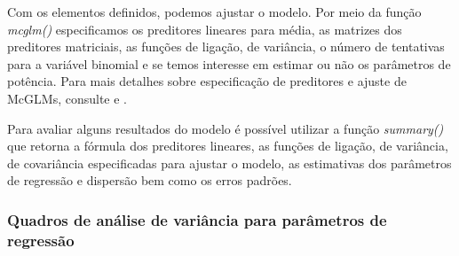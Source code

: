 Com os elementos definidos, podemos ajustar o modelo. Por meio da função \emph{mcglm()} especificamos os preditores lineares para média, as matrizes dos preditores matriciais, as funções de ligação, de variância, o número de tentativas para a variável binomial e se temos interesse em estimar ou não os parâmetros de potência. Para mais detalhes sobre especificação de preditores e ajuste de McGLMs, consulte \citet{Bonat16} e \citet{mcglm}.

\begin{knitrout}
\color{fgcolor}\begin{kframe}
\begin{alltt}
 \hlkwb{<-} \hlstd{(} \hlstd{=} 
                    \hlstd{=} \hlstd{(}
                    \hlstd{=} \hlstd{(}\hlstd{,}
                            \hlstd{,}
                            \hlstd{),}
                    \hlstd{=} \hlstd{(}\hlstd{,}
                                \hlstd{,}
                                \hlstd{),}
                    \hlstd{=} \hlstd{(}\hlstd{,}
                                 \hlstd{,}
                                 \hlopt{$}
                    \hlstd{=} 
                    
\end{alltt}
\end{kframe}
\end{knitrout}


Para avaliar alguns resultados do modelo é possível utilizar a função \emph{summary()} que retorna a fórmula dos preditores lineares, as funções de ligação, de variância, de covariância especificadas para ajustar o modelo, as estimativas dos parâmetros de regressão e dispersão bem como os erros padrões.

\subsubsection{Quadros de análise de variância para parâmetros de regressão}

